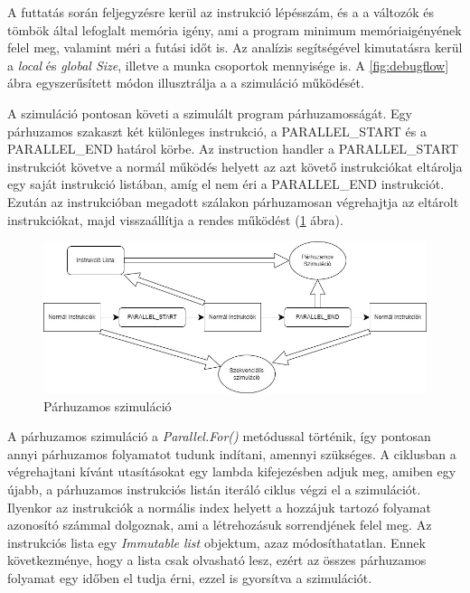 A futtatás során feljegyzésre kerül az instrukció lépésszám, és a a változók és tömbök által lefoglalt memória igény, ami a program minimum memóriaigényének felel meg, valamint méri a futási időt is. Az analízis segítségével kimutatásra kerül a \textit{local} és \textit{global Size}, illetve a munka csoportok mennyisége is. A \ref{fig:debugflow} ábra egyszerűsített módon illusztrálja a a szimuláció működését.



A szimuláció pontosan követi a szimulált program párhuzamosságát. Egy párhuzamos szakaszt két különleges instrukció, a PARALLEL{\_}START és a PARALLEL{\_}END határol körbe. Az instruction handler a PARALLEL{\_}START instrukciót követve a normál működés helyett az azt követő instrukciókat eltárolja egy saját instrukció listában, amíg el nem éri a PARALLEL{\_}END instrukciót. Ezután az instrukcióban megadott szálakon párhuzamosan végrehajtja az eltárolt instrukciókat, majd visszaállítja a rendes működést (\ref{fig:parallelSim} ábra).


\begin{figure}[h]
\centering
\includegraphics[width=\textwidth]{images/Parallel_Simulation.jpg}
\caption{Párhuzamos szimuláció}
\label{fig:parallelSim}
\end{figure}


A párhuzamos szimuláció a \textit{Parallel.For()} \cite{pfor} metódussal történik, így pontosan annyi párhuzamos folyamatot tudunk indítani, amennyi szükséges. A ciklusban a végrehajtani kívánt utasításokat egy lambda kifejezésben adjuk meg, amiben egy újabb, a párhuzamos instrukciós listán iteráló ciklus végzi el a szimulációt. Ilyenkor az instrukciók a normális index helyett a hozzájuk tartozó folyamat azonosító számmal dolgoznak, ami a létrehozásuk sorrendjének felel meg. Az instrukciós lista egy \textit{Immutable list} objektum, azaz módosíthatatlan. Ennek következménye, hogy a lista csak olvasható lesz, ezért az összes párhuzamos folyamat egy időben el tudja érni, ezzel is gyorsítva a szimulációt.

